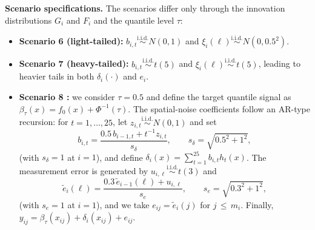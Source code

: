 \documentclass[twoside,11pt]{article}
\begin{document}
\smallskip
\noindent\textbf{Scenario specifications.}
The scenarios differ only through the innovation distributions $G_i$ and $F_i$ and the quantile level $\tau$:
\begin{itemize}
    \item \textbf{Scenario 6 (light-tailed):} $b_{i,t}\stackrel{\text{i.i.d.}}{\sim}N(0,1)$ and $\xi_i(\ell)\stackrel{\text{i.i.d.}}{\sim}N(0,0.5^2)$.
    \item \textbf{Scenario 7 (heavy-tailed):} $b_{i,t}\stackrel{\text{i.i.d.}}{\sim}t(5)$ and $\xi_i(\ell)\stackrel{\text{i.i.d.}}{\sim}t(5)$, leading to heavier tails in both $\delta_i(\cdot)$ and $e_i$.
    \item \textbf{Scenario 8 
    :}
we consider $\tau=0.5$ and define the target quantile signal as 
$\beta_\tau(x)=f_0(x)+\Phi^{-1}(\tau)$.
The spatial-noise coefficients follow an AR-type recursion:
for $t=1,\ldots,25$, let $z_{i,t}\stackrel{\mathrm{i.i.d.}}{\sim}N(0,1)$ and set
\[
b_{i,t}=\frac{0.5\,b_{i-1,t}+t^{-1}z_{i,t}}{s_\delta},
\qquad s_\delta=\sqrt{0.5^2+1^2},
\]
(with $s_\delta=1$ at $i=1$), and define $\delta_i(x)=\sum_{t=1}^{25} b_{i,t}h_t(x)$.
The measurement error is generated by
$u_{i,\ell}\stackrel{\mathrm{i.i.d.}}{\sim}t(3)$ and
\[
\tilde e_i(\ell)=\frac{0.3\,\tilde e_{i-1}(\ell)+u_{i,\ell}}{s_e},
\qquad s_e=\sqrt{0.3^2+1^2},
\]
(with $s_e=1$ at $i=1$), and we take $e_{ij}=\tilde e_i(j)$ for $j\,\le\, m_i$.
Finally, $y_{ij}=\beta_\tau(x_{ij})+\delta_i(x_{ij})+e_{ij}$.
\end{itemize}

\end{document}
